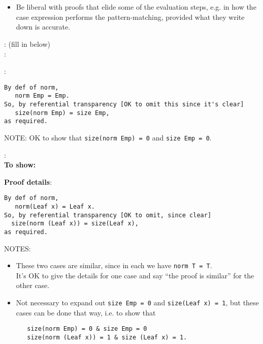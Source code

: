 \documentclass[answers,addpoints,12pt]{exam}
\begin{document}
\begin{questions}
\begin{solution}
\begin{itemize}
\item Be liberal with proofs that elide some of the evaluation steps, e.g. in how the case expression performs the pattern-matching,
provided what they write down is accurate.
\end{itemize}

\newpage

: (fill in below)\\


:

:

\begin{verbatim}
By def of norm, 
   norm Emp = Emp.     
So, by referential transparency [OK to omit this since it's clear]
   size(norm Emp) = size Emp,
as required.
\end{verbatim}


NOTE: OK to show that {\tt size(norm Emp) = 0} and {\tt size Emp = 0}.


: \\

{\bf To show:}

{\bf Proof details}:
\begin{verbatim}
By def of norm,
   norm(Leaf x) = Leaf x.
So, by referential transparency [OK to omit, since clear]
  size(norm (Leaf x)) = size(Leaf x),
as required.
\end{verbatim}

\vspace{1cm}

NOTES:
\begin{itemize}
\item These two cases are similar, since in each we have {\tt norm T = T}.\\
It's OK to give the details for one case and say ``the proof is similar'' for the other case.

\item Not necessary to expand out {\tt size Emp = 0} and {\tt size(Leaf x) = 1},
but these cases can be done that way, i.e. to show that
\begin{verbatim}
   size(norm Emp) = 0 & size Emp = 0
   size(norm (Leaf x)) = 1 & size (Leaf x) = 1.
\end{verbatim}

\end{itemize}




\end{solution}
\end{questions}
\end{document}
